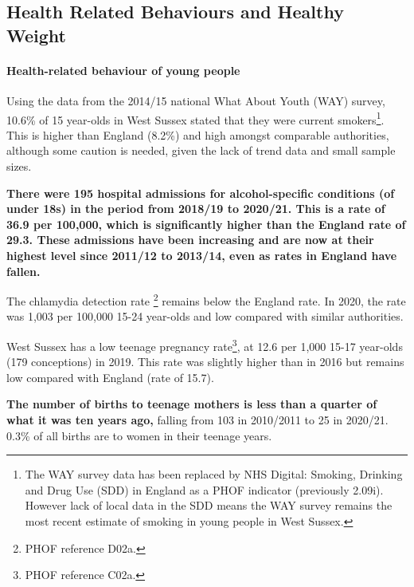 
\subsection{Health Related Behaviours and Healthy Weight}
\paragraph{Health-related behaviour of young people} 
Using the data from the 2014/15 national What About Youth (WAY) survey, 10.6\% of 15 year-olds in West Sussex stated that they were current smokers\footnote{The WAY survey data has been replaced by NHS Digital: Smoking, Drinking and Drug Use (SDD) in England as a PHOF indicator (previously 2.09i). However lack of local data in the SDD means the WAY survey remains the most recent estimate of smoking in young people in West Sussex.}. This is higher than England (8.2\%) and high amongst comparable authorities, although some caution is needed, given the lack of trend data and small sample sizes.

{\bfseries There were 195 hospital admissions for alcohol-specific conditions (of under 18s) in the period from 2018/19 to 2020/21. This is a rate of 36.9 per 100,000, which is significantly higher than the England rate of 29.3. These admissions have been increasing and are now at their highest level since 2011/12 to 2013/14, even as rates in England have fallen.}

The chlamydia detection rate \footnote{PHOF reference D02a.} remains below the England rate. In 2020, the rate was 1,003 per 100,000 15-24 year-olds and low compared with similar authorities.

West Sussex has a low teenage pregnancy rate\footnote{PHOF reference C02a.}, at 12.6 per 1,000 15-17 year-olds (179 conceptions) in 2019. This rate was slightly higher than in 2016 but remains low compared with England (rate of 15.7).


{\bfseries The number of births to teenage mothers is less than a quarter of what it was ten years ago,} falling from 103 in 2010/2011 to 25 in 2020/21. 0.3\% of all births are to women in their teenage years. 

